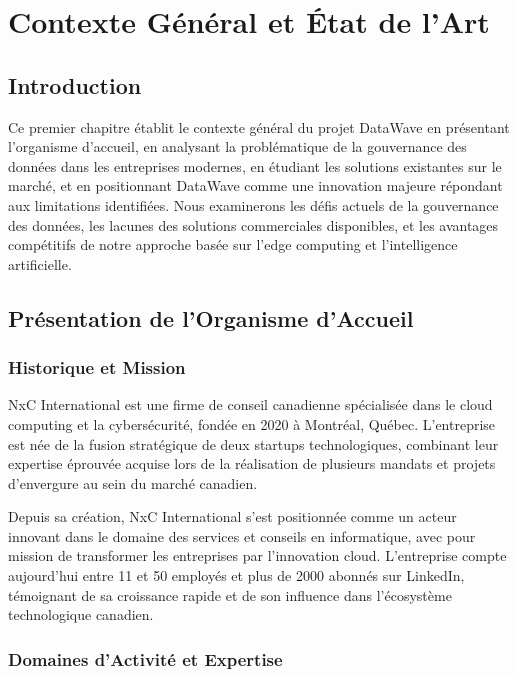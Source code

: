 \chapter{Contexte Général et État de l'Art}

\section*{Introduction}

Ce premier chapitre établit le contexte général du projet DataWave en présentant l'organisme d'accueil, en analysant la problématique de la gouvernance des données dans les entreprises modernes, en étudiant les solutions existantes sur le marché, et en positionnant DataWave comme une innovation majeure répondant aux limitations identifiées. Nous examinerons les défis actuels de la gouvernance des données, les lacunes des solutions commerciales disponibles, et les avantages compétitifs de notre approche basée sur l'edge computing et l'intelligence artificielle.

\section{Présentation de l'Organisme d'Accueil}

\subsection{Historique et Mission}

NxC International est une firme de conseil canadienne spécialisée dans le cloud computing et la cybersécurité, fondée en 2020 à Montréal, Québec. L'entreprise est née de la fusion stratégique de deux startups technologiques, combinant leur expertise éprouvée acquise lors de la réalisation de plusieurs mandats et projets d'envergure au sein du marché canadien.

Depuis sa création, NxC International s'est positionnée comme un acteur innovant dans le domaine des services et conseils en informatique, avec pour mission de transformer les entreprises par l'innovation cloud. L'entreprise compte aujourd'hui entre 11 et 50 employés et plus de 2000 abonnés sur LinkedIn, témoignant de sa croissance rapide et de son influence dans l'écosystème technologique canadien.

\subsection{Domaines d'Activité et Expertise}

